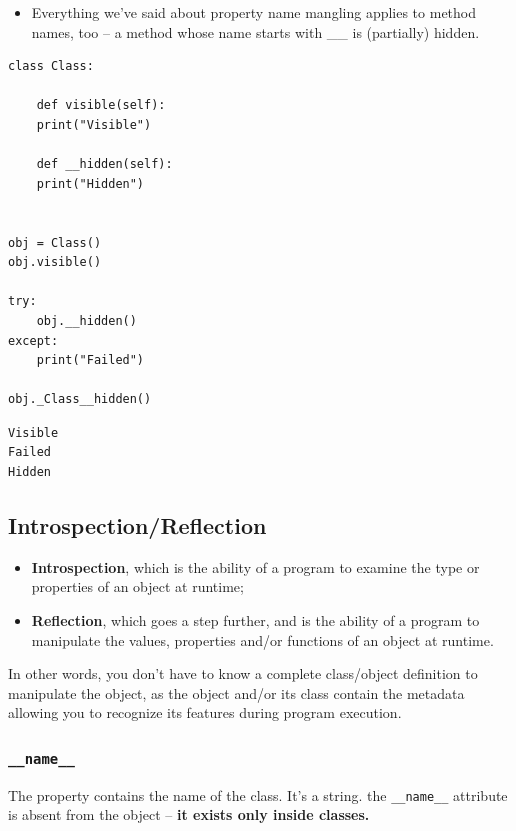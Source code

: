 \documentclass[11pt]{article}
\begin{document}
\vspace{10 mm}

\begin{itemize}
\item Everything we’ve said about property name mangling applies to method
names, too – a method whose name starts with \_\_ is (partially)
hidden.
\end{itemize}

\begin{verbatim}
class Class:

    def visible(self):
	print("Visible")

    def __hidden(self):
	print("Hidden")


obj = Class()
obj.visible()

try:
    obj.__hidden()
except:
    print("Failed")

obj._Class__hidden()

\end{verbatim}

\begin{verbatim}
Visible
Failed
Hidden
\end{verbatim}
\subsection{Introspection/Reflection}
\label{sec:org3ad7f76}
\begin{itemize}
\item \textbf{Introspection}, which is the ability of a program to examine the
type or properties of an object at runtime;
\item \textbf{Reflection}, which goes a step further, and is the ability of a
program to manipulate the values, properties and/or functions of an
object at runtime.
\end{itemize}

In other words, you don’t have to know a complete class/object
definition to manipulate the object, as the object and/or its class
contain the metadata allowing you to recognize its features during
program execution.

\subsubsection{\texttt{\_\_name\_\_}}
\label{sec:orgc537964}
The property contains the name of the class. It’s a string. the
\texttt{\_\_name\_\_} attribute is absent from the object – \textbf{it exists only inside
classes.}
\end{document}
